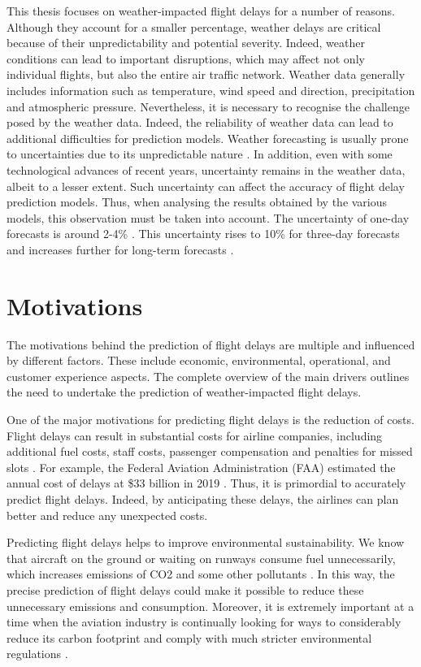 \documentclass[12pt,oneside]{book} %
\begin{document}
\noindent This thesis focuses on weather-impacted flight delays for a number of reasons. Although they account for a smaller percentage, weather delays are critical because of their unpredictability and potential severity. Indeed, weather conditions can lead to important disruptions, which may affect not only individual flights, but also the entire air traffic network. Weather data generally includes information such as temperature, wind speed and direction, precipitation and atmospheric pressure. Nevertheless, it is necessary to recognise the challenge posed by the weather data. Indeed, the reliability of weather data can lead to additional difficulties for prediction models. Weather forecasting is usually prone to uncertainties due to its unpredictable nature \cite{Weather_forecast}. In addition, even with some technological advances of recent years, uncertainty remains in the weather data, albeit to a lesser extent. Such uncertainty can affect the accuracy of flight delay prediction models. Thus, when analysing the results obtained by the various models, this observation must be taken into account. The uncertainty of one-day forecasts is around 2-4\% \cite{Weather_forecast}. This uncertainty rises to 10\% for three-day forecasts and increases further for long-term forecasts \cite{Weather_forecast}.

\section{Motivations}

\noindent The motivations behind the prediction of flight delays are multiple and influenced by different factors. These include economic, environmental, operational, and customer experience aspects. The complete overview of the main drivers outlines the need to undertake the prediction of weather-impacted flight delays.

\noindent One of the major motivations for predicting flight delays is the reduction of costs. Flight delays can result in substantial costs for airline companies, including additional fuel costs, staff costs, passenger compensation and penalties for missed slots \cite{Anupkumar}. For example, the Federal Aviation Administration (FAA) estimated the annual cost of delays at \$33 billion in 2019 \cite{delay_costs}. Thus, it is primordial to accurately predict flight delays. Indeed, by anticipating these delays, the airlines can plan better and reduce any unexpected costs.

\noindent Predicting flight delays helps to improve environmental sustainability. We know that aircraft on the ground or waiting on runways consume fuel unnecessarily, which increases emissions of CO2 and some other pollutants \cite{motivation_environment}. In this way, the precise prediction of flight delays could make it possible to reduce these unnecessary emissions and consumption. Moreover, it is extremely important at a time when the aviation industry is continually looking for ways to considerably reduce its carbon footprint and comply with much stricter environmental regulations \cite{motivation_environment}.
\end{document}
